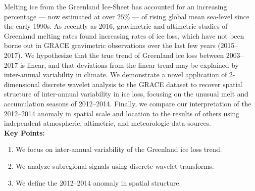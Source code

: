 
Melting ice from the Greenland Ice-Sheet has accounted for an increasing percentage --- now estimated at over $25\%$ --- of rising global mean sea-level since the early 1990s. As recently as 2016, gravimetric and altimetric studies of Greenland melting rates found  increasing rates of ice loss, which have not been borne out in GRACE gravimetric observations over the last few years (2015--2017). We hypothesize that the true trend of Greenland ice loss between 2003--2017 is linear, and that deviations from the linear trend may be explained by inter-annual variability in climate. We demonstrate a novel application of 2-dimensional discrete wavelet analysis to the GRACE dataset to recover spatial structure of inter-annual variability in ice loss, focusing on the unusual melt and accumulation seasons of 2012--2014. Finally, we compare our interpretation of the 2012--2014 anomaly in spatial scale and location to the results of others using independent atmospheric, altimetric, and meteorologic data sources. \\[3em]

\textbf{Key Points:}
\begin{enumerate}
	\item We focus on inter-annual variability of the Greenland ice loss trend.
	\item We analyze subregional signals using discrete wavelet transforms.
	\item We define the 2012--2014 anomaly in spatial structure.

\end{enumerate}